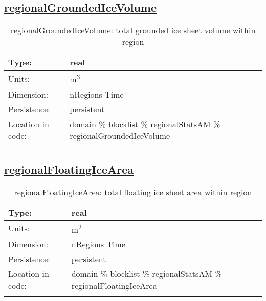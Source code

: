 \subsection[regionalGroundedIceVolume]{\hyperref[sec:var_tab_regionalStatsAM]{regionalGroundedIceVolume}}
\label{subsec:var_sec_regionalStatsAM_regionalGroundedIceVolume}
\begin{center}
\begin{longtable}{| p{2.0in} | p{4.0in} |}
        \hline 
        Type: & real \\
        \hline 
        Units: & \si{m^3} \\
        \hline 
        Dimension: & nRegions Time \\
        \hline 
        Persistence: & persistent \\
        \hline 
         Location in code: & domain \% blocklist \% regionalStatsAM \% regionalGroundedIceVolume \\
         \hline 
    \caption{regionalGroundedIceVolume: total grounded ice sheet volume within region}
\end{longtable}
\end{center}
\subsection[regionalFloatingIceArea]{\hyperref[sec:var_tab_regionalStatsAM]{regionalFloatingIceArea}}
\label{subsec:var_sec_regionalStatsAM_regionalFloatingIceArea}
\begin{center}
\begin{longtable}{| p{2.0in} | p{4.0in} |}
        \hline 
        Type: & real \\
        \hline 
        Units: & \si{m^2} \\
        \hline 
        Dimension: & nRegions Time \\
        \hline 
        Persistence: & persistent \\
        \hline 
         Location in code: & domain \% blocklist \% regionalStatsAM \% regionalFloatingIceArea \\
         \hline 
    \caption{regionalFloatingIceArea: total floating ice sheet area within region}
\end{longtable}
\end{center}
